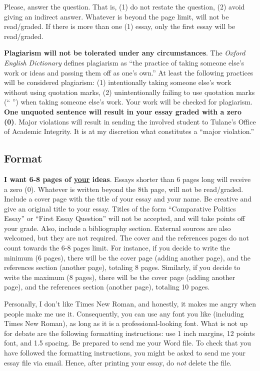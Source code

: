 \documentclass{article}
\begin{document}
Please, answer the question. That is, (1) do not restate the question, (2) avoid giving an indirect answer. Whatever is beyond the page limit, will not be read/graded. If there is more than one (1) essay, only the first essay will be read/graded.

{\bf Plagiarism will not be tolerated under any circumstances}. The \emph{Oxford English Dictionary} defines plagiarism as ``the practice of taking someone else's work or ideas and passing them off as one's own.'' At least the following practices will be considered plagiarism: (1) intentionally taking someone else's work without using quotation marks, (2) unintentionally failing to use quotation marks (`` '') when taking someone else's work. Your work will be checked for plagiarism. {\bf One unquoted sentence will result in your essay graded with a zero (0)}. Major violations will result in sending the involved student to Tulane's Office of Academic Integrity. It is at my discretion what constitutes a ``major violation.''

\subsection*{Format}

{\bf I want 6-8 pages of \underline{your} ideas}. Essays shorter than 6 pages long will receive a zero (0). Whatever is written beyond the 8th page, will not be read/graded. Include a cover page with the title of your essay and your name. Be creative and give an original title to your essay. Titles of the form ``Comparative Politics Essay'' or ``First Essay Question'' will not be accepted, and will take points off your grade. Also, include a bibliography section. External sources are also welcomed, but they are not required. The cover and the references pages do not count towards the 6-8 pages limit. For instance, if you decide to write the minimum (6 pages), there will be the cover page (adding another page), and the references section (another page), totaling 8 pages. Similarly, if you decide to write the maximum (8 pages), there will be the cover page (adding another page), and the references section (another page), totaling 10 pages.

Personally, I don't like Times New Roman, and honestly, it makes me angry when people make me use it. Consequently, you can use any font you like (including Times New Roman), as long as it is a professional-looking font. What is not up for debate are the following formatting instructions: use 1 inch margins, 12 points font, and 1.5 spacing. Be prepared to send me your Word file. To check that you have followed the formatting instructions, you might be asked to send me your essay file via email. Hence, after printing your essay, do \emph{not} delete the file. 
\end{document}
